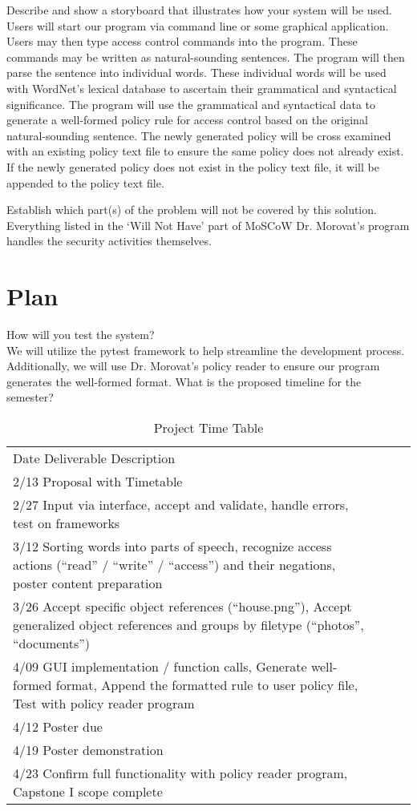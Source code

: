 \documentclass[12pt]{article}
\begin{document}
Describe and show a storyboard that illustrates how your system will be used. \\
Users will start our program via command line or some graphical application. Users may then type access control commands into the program. These commands may be written as natural-sounding sentences. The program will then parse the sentence into individual words. These individual words will be used with WordNet’s lexical database to ascertain their grammatical and syntactical significance. The program will use the grammatical and syntactical data to generate a well-formed policy rule for access control based on the original natural-sounding sentence. The newly generated policy will be cross examined with an existing policy text file to ensure the same policy does not already exist. If the newly generated policy does not exist in the policy text file, it will be appended to the policy text file.

Establish which part(s) of the problem will not be covered by this solution. \\
Everything listed in the ‘Will Not Have’ part of MoSCoW
Dr. Morovat’s program handles the security activities themselves.

\section{Plan}
How will you test the system? \\
We will utilize the pytest framework to help streamline the development process. Additionally, we will use Dr. Morovat’s policy reader to ensure our program generates the well-formed format.
What is the proposed timeline for the semester?  \\
\begin{table}[]
\caption{Project Time Table}
\begin{tabular}{llll}
    Date   Deliverable     Description \\
    2/13   Proposal with Timetable   & \\
    2/27   Input via interface, accept and validate, handle errors, test on frameworks  & \\
    3/12     Sorting words into parts of speech, recognize access actions (“read” / “write” / “access”) and their negations, poster content preparation    & \\
    3/26   Accept specific object references (“house.png”), Accept generalized object references and groups by filetype (“photos”, “documents”)  & \\
    4/09    GUI implementation / function calls, Generate well-formed format, Append the formatted rule to user policy file, Test with policy reader program    & \\
    4/12    Poster due  & \\
    4/19    Poster demonstration    & \\
    4/23    Confirm full functionality with policy reader program, Capstone I scope complete   & \\

\end{tabular}
\end{table}
\end{document}
